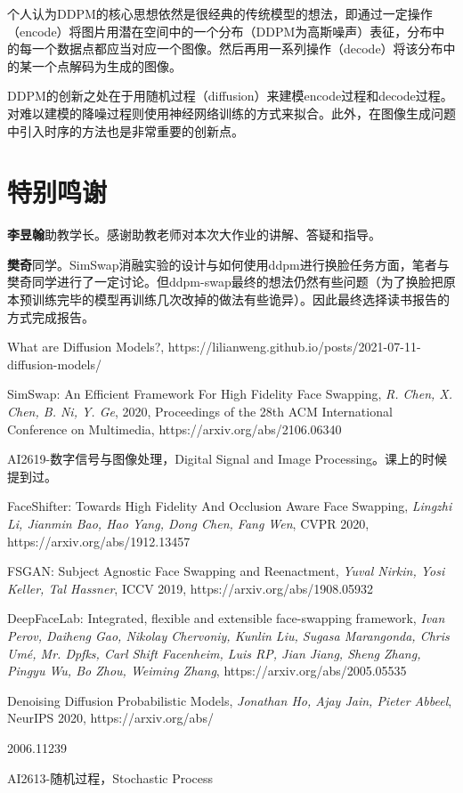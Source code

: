 \documentclass[a4paper]{article}
\begin{document}
个人认为DDPM的核心思想依然是很经典的传统模型的想法，即通过一定操作（encode）将图片用潜在空间中的一个分布（DDPM为高斯噪声）表征，分布中的每一个数据点都应当对应一个图像。然后再用一系列操作（decode）将该分布中的某一个点解码为生成的图像。

DDPM的创新之处在于用随机过程（diffusion）来建模encode过程和decode过程。对难以建模的降噪过程则使用神经网络训练的方式来拟合。此外，在图像生成问题中引入时序的方法也是非常重要的创新点。

\section{特别鸣谢}
\textbf{李昱翰}助教学长。感谢助教老师对本次大作业的讲解、答疑和指导。

\textbf{樊奇}同学。SimSwap消融实验的设计与如何使用ddpm进行换脸任务方面，笔者与樊奇同学进行了一定讨论。但ddpm-swap最终的想法仍然有些问题（为了换脸把原本预训练完毕的模型再训练几次改掉的做法有些诡异）。因此最终选择读书报告的方式完成报告。

\begin{thebibliography}{}

 What are Diffusion Models?, https://lilianweng.github.io/posts/2021-07-11-diffusion-models/

 SimSwap: An Efficient Framework For High Fidelity Face Swapping, \textit{R. Chen, X. Chen, B. Ni, Y. Ge}, 2020, Proceedings of the 28th ACM International Conference on Multimedia, https://arxiv.org/abs/2106.06340

 AI2619-数字信号与图像处理，Digital Signal and Image Processing。课上的时候提到过。

 FaceShifter: Towards High Fidelity And Occlusion Aware Face Swapping, \textit{Lingzhi Li, Jianmin Bao, Hao Yang, Dong Chen, Fang Wen}, CVPR 2020, https://arxiv.org/abs/1912.13457

 FSGAN: Subject Agnostic Face Swapping and Reenactment, \textit{Yuval Nirkin, Yosi Keller, Tal Hassner}, ICCV 2019, https://arxiv.org/abs/1908.05932

 DeepFaceLab: Integrated, flexible and extensible face-swapping framework, \textit{Ivan Perov, Daiheng Gao, Nikolay Chervoniy, Kunlin Liu, Sugasa Marangonda, Chris Umé, Mr. Dpfks, Carl Shift Facenheim, Luis RP, Jian Jiang, Sheng Zhang, Pingyu Wu, Bo Zhou, Weiming Zhang}, https://arxiv.org/abs/2005.05535

 Denoising Diffusion Probabilistic Models, \textit{Jonathan Ho, Ajay Jain, Pieter Abbeel}, NeurIPS 2020, https://arxiv.org/abs/

2006.11239

 AI2613-随机过程，Stochastic Process


\end{thebibliography}
\end{document}
